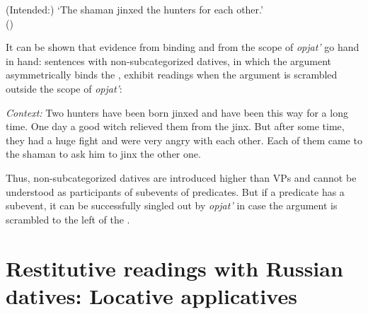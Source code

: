 \documentclass[output=paper]{langscibook}
\begin{document}
 \ea\label{ex:bondarenko:34}
\z
\glt (Intended:) `The shaman jinxed the hunters for each other.'\\\hfill (\citealt{Boneh-Nash2017})
\z



\noindent It can be shown that evidence from binding and from the scope of \textit{opjat’} go hand in hand: sentences with non-subcategorized datives, in which the  argument asymmetrically binds the , exhibit  readings when the  argument is scrambled outside the scope of \textit{opjat’}:


 \ea\label{ex:bondarenko:35}
\textit{Context:} Two hunters have been born jinxed and have been this way for a long time. One day a good witch relieved them from the jinx. But after some time, they had a huge fight and were very angry with each other. Each of them came to the shaman to ask him to jinx the other one.
\z


\noindent Thus, non-subcategorized datives are introduced higher than VPs and cannot be understood as participants of  subevents of predicates. But if a predicate has a  subevent, it can be successfully singled out by \textit{opjat’} in case the  argument is scrambled to the left of the  .


\section{Restitutive readings with Russian datives: Locative applicatives}\label{s5}
\end{document}
